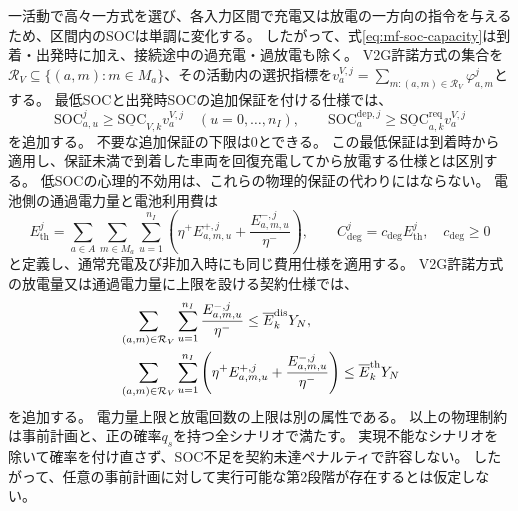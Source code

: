 一活動で高々一方式を選び、各入力区間で充電又は放電の一方向の指令を与えるため、区間内のSOCは単調に変化する。
したがって、式\eqref{eq:mf-soc-capacity}は到着・出発時に加え、接続途中の過充電・過放電も除く。
V2G許諾方式の集合を$\mathcal R_V\subseteq\{(a,m):m\in M_a\}$、その活動内の選択指標を$v_a^{V,j}=\sum_{m:(a,m)\in\mathcal R_V}\varphi_{a,m}^j$とする。
最低SOCと出発時SOCの追加保証を付ける仕様では、
\begin{equation}
 \mathrm{SOC}_{a,u}^j\ge\underline{\mathrm{SOC}}_{V,k}v_a^{V,j}
 \quad(u=0,\ldots,n_I),\qquad
 \mathrm{SOC}_a^{\mathrm{dep},j}
 \ge\underline{\mathrm{SOC}}_{a,k}^{\mathrm{req}}v_a^{V,j}
 \label{eq:mf-soc-protection}
\end{equation}
を追加する。
不要な追加保証の下限は0とできる。
この最低保証は到着時から適用し、保証未満で到着した車両を回復充電してから放電する仕様とは区別する。
低SOCの心理的不効用は、これらの物理的保証の代わりにはならない。
電池側の通過電力量と電池利用費は
\begin{equation}
 E_{\mathrm{th}}^j=\sum_{a\in A}\sum_{m\in M_a}\sum_{u=1}^{n_I}
 \left(\eta^+E_{a,m,u}^{+,j}+\frac{E_{a,m,u}^{-,j}}{\eta^-}\right),
 \qquad C_{\mathrm{deg}}^j=c_{\mathrm{deg}}E_{\mathrm{th}}^j,
 \quad c_{\mathrm{deg}}\ge0
 \label{eq:mf-degradation}
\end{equation}
と定義し、通常充電及び非加入時にも同じ費用仕様を適用する。
V2G許諾方式の放電量又は通過電力量に上限を設ける契約仕様では、
\begin{align}
 &\sum_{(a,m)\in\mathcal R_V}\sum_{u=1}^{n_I}
 \frac{E_{a,m,u}^{-,j}}{\eta^-}
 \le\overline E_k^{\mathrm{dis}}Y_N,\notag\\
 &\sum_{(a,m)\in\mathcal R_V}\sum_{u=1}^{n_I}
 \left(\eta^+E_{a,m,u}^{+,j}+\frac{E_{a,m,u}^{-,j}}{\eta^-}\right)
 \le\overline E_k^{\mathrm{th}}Y_N
 \label{eq:mf-throughput-limits}
\end{align}
を追加する。
電力量上限と放電回数の上限は別の属性である。
以上の物理制約は事前計画と、正の確率$q_s$を持つ全シナリオで満たす。
実現不能なシナリオを除いて確率を付け直さず、SOC不足を契約未達ペナルティで許容しない。
したがって、任意の事前計画に対して実行可能な第2段階が存在するとは仮定しない。

